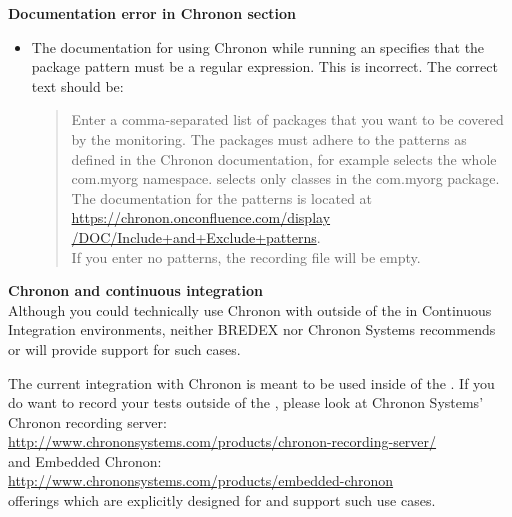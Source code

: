 \textbf{Documentation error in Chronon section}
\begin{itemize}
\item The documentation for using Chronon while running an \gdaut{} specifies that the package pattern must be a regular expression. This is incorrect. The correct text should be: 
\begin{quote}Enter a comma-separated list of packages that you want to be covered by the monitoring. The packages must adhere to the patterns as defined in the Chronon documentation, for example  selects the whole com.myorg namespace.  selects only classes in the com.myorg package. The documentation for the patterns is located at \\
\href{https://chronon.onconfluence.com/display/DOC/Include+and+Exclude+patterns}{https://chronon.onconfluence.com/display\\
/DOC/Include+and+Exclude+patterns}.\\
 If you enter no patterns, the recording file will be empty.
\end{quote}
\end{itemize}

\textbf{Chronon and continuous integration}\\

Although you could technically use Chronon with \app{} outside of the \ite{} in Continuous Integration environments, neither BREDEX nor Chronon Systems recommends or will provide support for such cases.

The current integration with Chronon is meant to be used inside of the \ite{}. If you do want to record your tests outside of the \ite{}, please look at Chronon Systems' Chronon recording server:\\
 \href{http://www.chrononsystems.com/products/chronon-recording-server/}{http://www.chrononsystems.com/products/chronon-recording-server/}\\
and Embedded Chronon:\\
\href{http://www.chrononsystems.com/products/embedded-chronon}{http://www.chrononsystems.com/products/embedded-chronon} \\
 offerings which are explicitly designed for and support such use cases.

